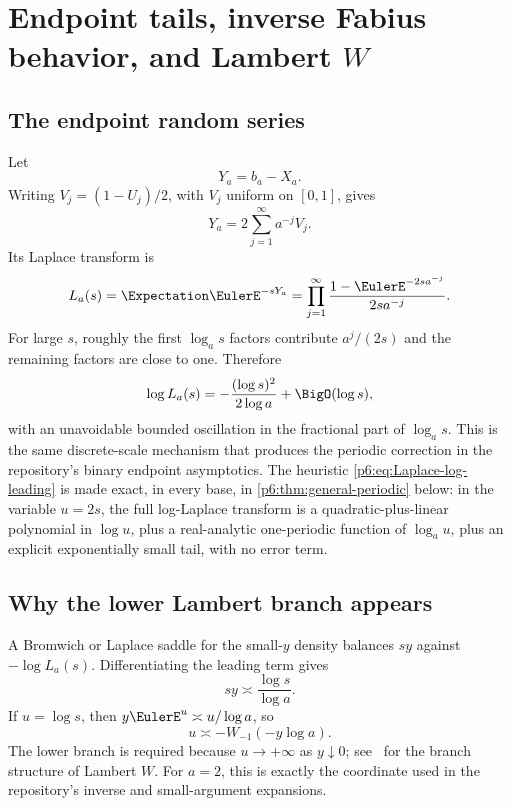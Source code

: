 \documentclass[11pt,oneside]{article}
\numberwithin{equation}{section}
\theoremstyle{definition}
\theoremstyle{remark}
\begin{document}
\section{Endpoint tails, inverse Fabius behavior, and Lambert \texorpdfstring{$W$}{W}}
\label{p6:sec:general-laplace}

\subsection{The endpoint random series}

Let
\begin{equation}\label{p6:eq:Ya}
 Y_a=b_a-X_a.
\end{equation}
Writing $V_j=(1-U_j)/2$, with $V_j$ uniform on $[0,1]$, gives
\begin{equation}\label{p6:eq:Ya-series}
 Y_a=2\sum_{j=1}^{\infty}a^{-j}V_j.
\end{equation}
Its Laplace transform is
\begin{equation}\label{p6:eq:Ya-Laplace}
 L_a(s)=\Expectation\EulerE^{-sY_a}
 =\prod_{j=1}^{\infty}
 \frac{1-\EulerE^{-2sa^{-j}}}{2sa^{-j}}.
\end{equation}
For large $s$, roughly the first $\log_a s$ factors contribute
$a^j/(2s)$ and the remaining factors are close to one.  Therefore
\begin{equation}\label{p6:eq:Laplace-log-leading}
 \log L_a(s)
 =-\frac{(\log s)^2}{2\log a}
 +\BigO(\log s),
\end{equation}
with an unavoidable bounded oscillation in the fractional part of $\log_a s$.
This is the same discrete-scale mechanism that produces the periodic correction
in the repository's binary endpoint asymptotics.  The heuristic
\eqref{p6:eq:Laplace-log-leading} is made exact, in every base, in
\cref{p6:thm:general-periodic} below: in the variable $u=2s$, the full
log-Laplace transform is a quadratic-plus-linear polynomial in $\log u$, plus a
real-analytic one-periodic function of $\log_au$, plus an explicit
exponentially small tail, with no error term.

\subsection{Why the lower Lambert branch appears}

A Bromwich or Laplace saddle for the small-$y$ density balances
$sy$ against $-\log L_a(s)$.  Differentiating the leading term gives
\begin{equation}\label{p6:eq:saddle-balance}
 sy\asymp\frac{\log s}{\log a}.
\end{equation}
If $u=\log s$, then $y\EulerE^u\asymp u/\log a$, so
\begin{equation}\label{p6:eq:Lambert-coordinate}
 u\asymp-W_{-1}(-y\log a).
\end{equation}
The lower branch is required because $u\to+\infty$ as $y\downarrow0$; see~\cite{p6:corless} for the branch structure of Lambert $W$.
For $a=2$, this is exactly the coordinate used in the repository's inverse and
small-argument expansions.
\end{document}
